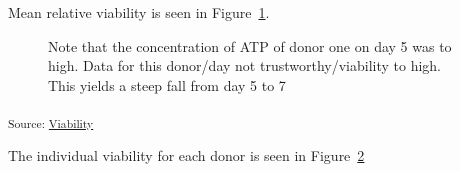 \documentclass[
  letterpaper,
  DIV=11,
  numbers=noendperiod,
  oneside]{scrartcl}
\begin{document}
Mean relative viability is seen in
Figure~\ref{fig-viability-relative-overall}.

\begin{figure}[H]


\caption{\label{fig-viability-relative-overall}Note that the
concentration of ATP of donor one on day 5 was to high. Data for this
donor/day not trustworthy/viability to high. This yields a steep fall
from day 5 to 7}

\end{figure}%

\textsubscript{Source:
\href{https://andreasludvig.github.io/manuscript_one/notebooks/viability/Viability-preview.html\#cell-fig-viability-relative-overall}{Viability}}

The individual viability for each donor is seen in
Figure~\ref{fig-donor-viabilities}

\begin{figure}[H]


\caption{\label{fig-donor-viabilities}}

\end{figure}%
\end{document}
